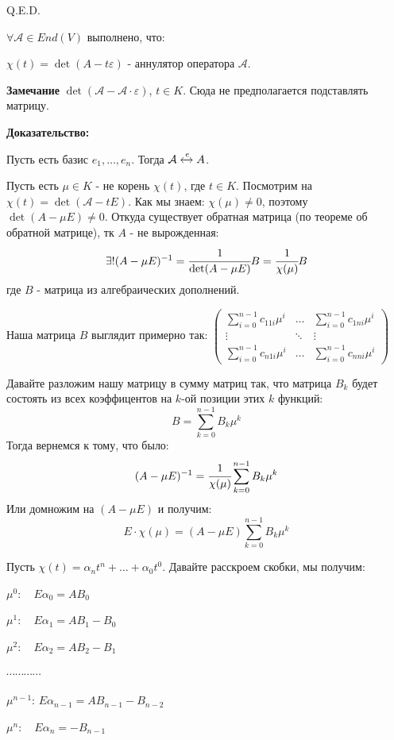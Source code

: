     \hfill Q.E.D.


$\forall \mathcal{A} \in End(V)$ выполнено, что:

$\chi(t)  = \det (A -t \varepsilon)$ - аннулятор оператора $\mathcal{A}$.

\textbf{Замечание} $\det (\mathcal{A} - \mathcal{A}\cdot \varepsilon)$, $t\in K$. Сюда не предполагается подставлять матрицу.

\textbf{Доказательство:}

Пусть есть базис $e_1,\ldots,e_n$. Тогда $\mathcal{A} \xleftrightarrow{e}A$.

Пусть есть $\mu \in K$ -  не корень $\chi(t)$, где $t \in K$. Посмотрим на $\chi (t) = \det (\mathcal{A} - tE )$. Как мы знаем:
$\chi(\mu) \neq 0$, поэтому $\det (A - \mu E) \neq 0$. Откуда существует обратная матрица (по теореме об обратной матрице), тк $A$ - не вырожденная:
$$\exists!(A-\mu E)^{-1} = \cfrac{1}{\det (A- \mu E)}B = \cfrac{1}{\chi(\mu)}B$$
где $B$ - матрица из алгебраических дополнений.

Наша матрица $B$ выглядит примерно так: $\begin{pmatrix}
    \sum\limits_{i=0}^{n-1}c_{11i}\mu^i & \ldots& \sum\limits_{i=0}^{n-1}c_{1ni}\mu^i\\
    \vdots &\ddots& \vdots \\
    \sum\limits_{i=0}^{n-1}c_{n1i}\mu^i& \ldots& \sum\limits_{i=0}^{n-1}c_{nni}\mu^i 
\end{pmatrix}$

Давайте разложим нашу матрицу в сумму матриц так, что матрица $B_k$ будет состоять из всех коэффицентов на $k$-ой позиции этих $k$ функций:
$$B = \sum\limits_{k=0}^{n-1} B_k \mu^k $$
Тогда вернемся  к тому, что было:
$$(A - \mu E)^{-1} = \cfrac{1}{\chi(\mu)}\sum\limits_{k=0}^{n-1} B_k \mu^k$$
Или домножим на $(A - \mu E)$  и получим:
$$E\cdot\chi(\mu) = (A - \mu E) \sum\limits_{k=0}^{n-1} B_k \mu^k$$

Пусть $\chi(t) = \alpha_nt^n + \ldots+\alpha_0t^0$. Давайте расскроем скобки, мы получим:

\hfill
\begin{minipage}[h]{0.6\linewidth}
$\mu^0:\quad E \alpha_0 = AB_0$

$\mu^1:\quad E \alpha_1 = AB_1 - B_0$

$\mu^2:\quad E \alpha_2 = AB_2 - B_1$

$\cdots \cdots \cdots \cdots$

$\mu^{n-1}:\,E \alpha_{n-1} = AB_{n-1} - B_{n-2}$

$\mu^n: \quad E \alpha_n = -B_{n-1}$
\end{minipage}

